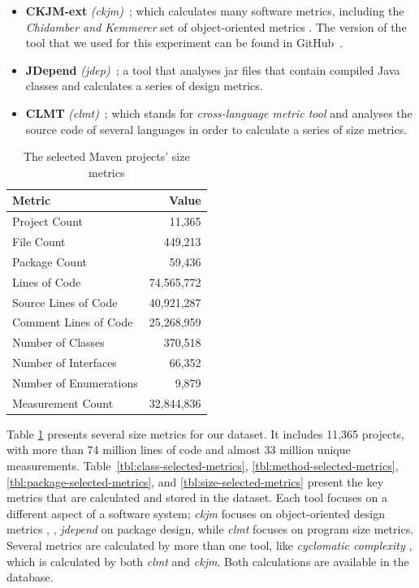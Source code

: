 \documentclass{sig-alternate}
\begin{document}
\begin{itemize}
  \item \textbf{CKJM-ext} \textit{(ckjm)}~\cite{Spi05g}; which calculates many software metrics, including the \textit{Chidamber and Kemmerer} set of object-oriented metrics \cite{CHKE94}. The version of the tool that we used for this experiment can be found in GitHub~\cite{CKJM}.

  \item \textbf{JDepend} \textit{(jdep)}~\cite{JDEPEND}; a tool that analyses {\sc jar} files that contain compiled Java classes and calculates a series of design metrics.

  \item \textbf{CLMT} \textit{(clmt)}~\cite{SGKL09}; which stands for \textit{cross-language metric tool} and analyses the source code of several languages in order to calculate a series of size metrics.
\end{itemize}

\begin{table}
\centering
\caption{The selected Maven projects' size metrics}
\label{tbl:oss-size-metrics}
\begin{tabular}{l r}
 \hline
\textbf{Metric} & \textbf{Value}\\
\hline
Project Count & 11,365\\
File Count & 449,213\\
Package Count & 59,436\\
Lines of Code & 74,565,772\\
Source Lines of Code & 40,921,287\\
Comment Lines of Code & 25,268,959\\
Number of Classes & 370,518\\
Number of Interfaces & 66,352\\
Number of Enumerations & 9,879\\
Measurement Count & 32,844,836\\
\hline
\end{tabular}
\end{table}

Table \ref{tbl:oss-size-metrics} presents several size metrics for our dataset. It includes 11,365 projects, with more than 74 million lines of code and almost 33 million unique measurements. Table~\ref{tbl:class-selected-metrics}, \ref{tbl:method-selected-metrics}, \ref{tbl:package-selected-metrics}, and \ref{tbl:size-selected-metrics} present the key metrics that are calculated and stored in the dataset. Each tool focuses on a different aspect of a software system; \textit{ckjm} focuses on object-oriented design metrics \cite{LOKI94}, \cite{CHKE94}, \textit{jdepend} on package design, while \textit{clmt} focuses on program size metrics. Several metrics are calculated by more than one tool, like \textit{cyclomatic complexity} \cite{cabe76}, which is calculated by both \textit{clmt} and \textit{ckjm}. Both calculations are available in the database.
\end{document}
